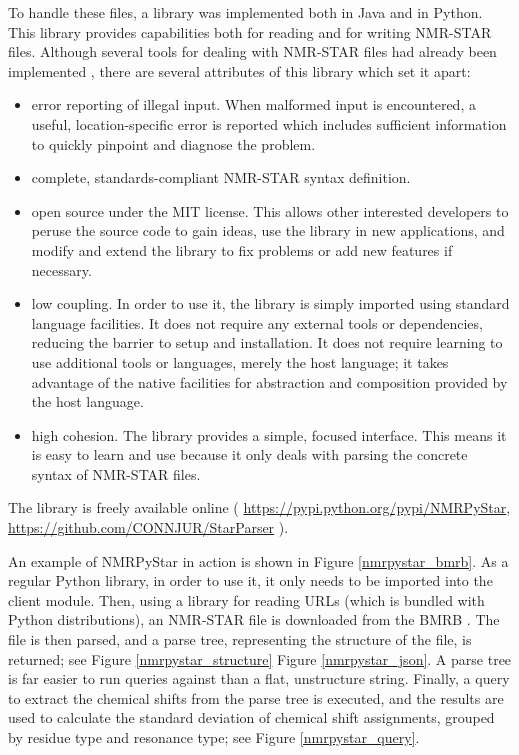 To handle these files, a library was implemented both in Java 
\cite{fenwick2013} and in Python.  This library provides capabilities both
for reading and for writing NMR-STAR files.  Although several tools for
dealing with NMR-STAR files had already been implemented \cite{ccpn, bmrb},
there are several attributes of this library which set it apart:
\begin{itemize}
  \item error reporting of illegal input.  When malformed input is encountered,
    a useful, location-specific error is reported which includes sufficient
    information to quickly pinpoint and diagnose the problem.
  \item complete, standards-compliant NMR-STAR syntax definition.
  \item open source under the MIT license.  This allows other interested 
    developers to peruse the source code to gain ideas, use the library in
    new applications, and modify and extend the library to fix problems or
    add new features if necessary.
  \item low coupling.  In order to use it, the library is simply imported 
    using standard language facilities.  It does not require any external tools
    or dependencies, reducing the barrier to setup and installation.  It does
    not require learning to use additional tools or languages, merely the 
    host language; it takes advantage of the native facilities for abstraction
    and composition provided by the host language.
  \item high cohesion.  The library provides a simple, focused interface.
    This means it is easy to learn and use because it only deals with parsing
    the concrete syntax of NMR-STAR files.
\end{itemize}
The library is freely available online (
\url{https://pypi.python.org/pypi/NMRPyStar}, 
\url{https://github.com/CONNJUR/StarParser}
).

An example of NMRPyStar in action is shown in Figure \ref{nmrpystar_bmrb}.
As a regular Python library, in order to use it, it only needs to be 
imported into the client module.  Then, using a library for reading URLs
(which is bundled with Python distributions), an NMR-STAR file is downloaded
from the BMRB \cite{bmrb}.  The file is then parsed, and a parse tree, 
representing the structure of the file, is returned; see 
Figure \ref{nmrpystar_structure} Figure \ref{nmrpystar_json}.  
A parse tree is far easier to run queries against than a flat,
unstructure string.  Finally, a query to extract the chemical shifts
from the parse tree is executed, and the results are used to calculate the
standard deviation of chemical shift assignments, grouped by residue type
and resonance type; see Figure \ref{nmrpystar_query}.

